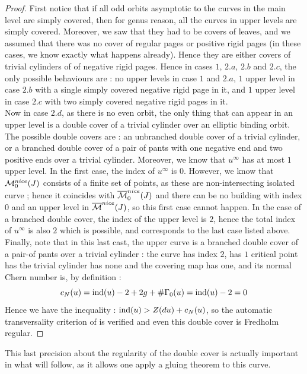 \documentclass[../main.tex]{subfiles}
\begin{document}
\begin{proof}
First notice that if all odd orbits asymptotic to the curves in the main level are simply covered, then for genus reason, all the curves in upper levels are simply covered. Moreover, we saw that they had to be covers of leaves, and we assumed that there was no cover of regular pages or positive rigid pages (in these cases, we know exactly what happens already). Hence they are either covers of trivial cylinders of of negative rigid pages. Hence in cases $1$, $2.a$, $2.b$ and $2.c$, the only possible behaviours are : no upper levels in case $1$ and $2.a$, $1$ upper level in case $2.b$ with a single simply covered negative rigid page in it, and $1$ upper level in case $2.c$ with two simply covered negative rigid pages in it. \\
Now in case $2.d$, as there is no even orbit, the only thing that can appear in an upper level is a double cover of a trivial cylinder over an elliptic binding orbit. The possible double covers are : an unbranched double cover of a trivial cylinder, or a branched double cover of a pair of pants with one negative end and two positive ends over a trivial cylinder. Moreover, we know that $u^\infty$ has at most $1$ upper level. In the first case, the index of $u^\infty$ is $0$. However, we know that ${\mathcal{M}}^{nice}_0(J)$ consists of a finite set of points, as these are non-intersecting isolated curve ; hence it coincides with $\overline{\mathcal{M}}^{nice}_0(J)$ and there can be no building with index $0$ and an upper level in $\overline{\mathcal{M}}^{nice}(J)$, so this first case cannot happen. In the case of a branched double cover, the index of the upper level is $2$, hence the total index of $u^\infty$ is also $2$ which is possible, and corresponds to the last case listed above. Finally, note that in this last cast, the upper curve is a branched double cover of a pair-of pants over a trivial cylinder : the curve has index $2$, has $1$ critical point has the trivial cylinder has none and the covering map has one, and its normal Chern number is, by definition :
$$c_N(u) = \text{ind}(u) - 2 + 2g + \#\Gamma_0(u) = \text{ind}(u) - 2 = 0$$
Hence we have the inequality : $\text{ind}(u) > Z(du) + c_N(u)$, so the automatic transversality criterion of \cite{wendl_automatic_2009} is verified and even this double cover is Fredholm regular.
\end{proof}

\begin{remark}
This last precision about the regularity of the double cover is actually important in what will follow, as it allows one apply a gluing theorem to this curve.
\end{remark}
\end{document}
